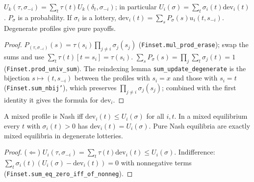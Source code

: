 \begin{lemma}[Multilinearity]
\label{lem:mixed-linear}
\leanok
{}
$U_k(\tau, \sigma_{-i}) = \sum_t \tau(t) U_k(\delta_t, \sigma_{-i})$; in particular $U_i(\sigma) = \sum_t \sigma_i(t)
\mathrm{dev}_i(t)$. $P_\sigma$ is a probability. If $\sigma_i$ is a lottery, $\mathrm{dev}_i(t) =
\sum_s P_\sigma(s) u_i(t, s_{-i})$. Degenerate profiles give pure payoffs.
\end{lemma}
\begin{proof}
\leanok
$P_{(\tau,\sigma_{-i})}(s) = \tau(s_i)\prod_{j\ne i}\sigma_j(s_j)$ (\texttt{Finset.mul\_prod\_erase}); swap the sums
and use $\sum_t \tau(t)[t = s_i] = \tau(s_i)$. $\sum_s P_\sigma(s) = \prod_j \sum_t \sigma_j(t) = 1$
(\texttt{Finset.prod\_univ\_sum}). The reindexing lemma \texttt{sum\_update\_degenerate} is the bijection
$s \mapsto (t, s_{-i})$ between the profiles with $s_i = x$ and those with $s_i = t$
(\texttt{Finset.sum\_nbij'}), which preserves $\prod_{j \ne i}\sigma_j(s_j)$; combined with the first identity it
gives the formula for $\mathrm{dev}_i$.
\end{proof}

\begin{theorem}
\label{thm:indifference}
\leanok
{}
A mixed profile is Nash iff $\mathrm{dev}_i(t) \le U_i(\sigma)$ for all $i, t$. In a mixed equilibrium every
$t$ with $\sigma_i(t) > 0$ has $\mathrm{dev}_i(t) = U_i(\sigma)$. Pure Nash equilibria are exactly mixed equilibria
in degenerate lotteries.
\end{theorem}
\begin{proof}
\leanok
($\Leftarrow$) $U_i(\tau,\sigma_{-i}) = \sum_t \tau(t)\mathrm{dev}_i(t) \le U_i(\sigma)$. Indifference:
$\sum_t \sigma_i(t)(U_i(\sigma) - \mathrm{dev}_i(t)) = 0$ with nonnegative terms
(\texttt{Finset.sum\_eq\_zero\_iff\_of\_nonneg}).
\end{proof}

